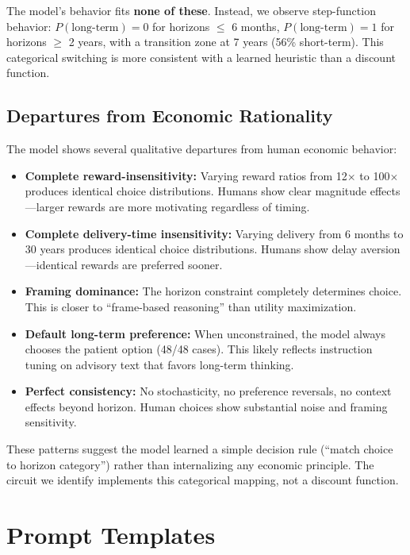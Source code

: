 \documentclass{article}
\begin{document}
The model's behavior fits \textbf{none of these}. Instead, we observe step-function behavior: $P(\text{long-term}) = 0$ for horizons $\leq$ 6 months, $P(\text{long-term}) = 1$ for horizons $\geq$ 2 years, with a transition zone at 7 years (56\% short-term). This categorical switching is more consistent with a learned heuristic than a discount function.

\subsection{Departures from Economic Rationality}

The model shows several qualitative departures from human economic behavior:

\begin{itemize}
    \item \textbf{Complete reward-insensitivity:} Varying reward ratios from 12$\times$ to 100$\times$ produces identical choice distributions. Humans show clear magnitude effects---larger rewards are more motivating regardless of timing.

    \item \textbf{Complete delivery-time insensitivity:} Varying delivery from 6 months to 30 years produces identical choice distributions. Humans show delay aversion---identical rewards are preferred sooner.

    \item \textbf{Framing dominance:} The horizon constraint completely determines choice. This is closer to ``frame-based reasoning'' than utility maximization.

    \item \textbf{Default long-term preference:} When unconstrained, the model always chooses the patient option (48/48 cases). This likely reflects instruction tuning on advisory text that favors long-term thinking.

    \item \textbf{Perfect consistency:} No stochasticity, no preference reversals, no context effects beyond horizon. Human choices show substantial noise and framing sensitivity.
\end{itemize}

These patterns suggest the model learned a simple decision rule (``match choice to horizon category'') rather than internalizing any economic principle. The circuit we identify implements this categorical mapping, not a discount function.

\section{Prompt Templates}
\end{document}
